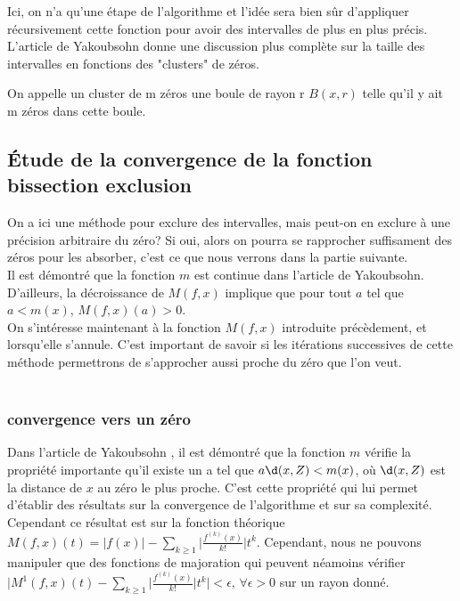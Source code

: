 \documentclass[a4paper,10.5pt]{article}
\begin{document}
	\noindent Ici, on n'a qu'une étape de l'algorithme et l'idée sera bien sûr d'appliquer récursivement cette fonction pour avoir des intervalles de plus en plus précis. L'article de Yakoubsohn donne une discussion plus complète sur la taille des intervalles en fonctions des "clusters" de zéros.\\
	
	\begin{definition}
		On appelle un cluster de m zéros une boule de rayon r $B(x,r)$ telle qu'il y ait m zéros dans cette boule.
	\end{definition}
	
	\subsection{Étude de la convergence de la fonction bissection exclusion}
	On a ici une méthode pour exclure des intervalles, mais peut-on en exclure à une précision arbitraire du zéro? Si oui, alors on pourra se rapprocher suffisament des zéros pour les absorber, c'est ce que nous verrons dans la partie suivante.\\
	Il est démontré que la fonction $m$ est continue dans l'article de Yakoubsohn. 
	D'ailleurs, la décroissance de $M(f,x)$ implique que pour tout $a$ tel que $a<m(x)$, $M(f,x)(a)>0$.\\
	On s'intéresse maintenant à la fonction $M(f,x)$ introduite précèdement, et lorsqu'elle s'annule. C'est important de savoir si les itérations successives de cette méthode permettrons de s'approcher aussi proche du zéro que l'on veut.\\
	\\
	\subsubsection{convergence vers un zéro}
	Dans l'article de Yakoubsohn \cite{DBLP:journals/jc/Yakoubsohn05}, il est démontré que la fonction $m$ vérifie la propriété importante qu'il existe un a tel que 
	$a\d(x,Z)<m(x)$, où $\d(x,Z)$ est la distance de $x$ au zéro le plus proche. C'est cette propriété qui lui permet d'établir des résultats sur la convergence de l'algorithme et sur sa complexité.\\
	Cependant ce résultat est sur la fonction théorique $M(f,x)(t)=|f(x)|-\sum_{k\geq1}\big|\frac{f^{(k)}(x)}{k!}\big|t^k$. Cependant, nous ne pouvons manipuler que des fonctions de majoration qui peuvent néamoins vérifier $\Big|M^1(f,x)(t)-\sum_{k\geq1}\big|\frac{f^{(k)}(x)}{k!}\big|t^k\Big| < \epsilon, \, \forall \epsilon>0$ sur un rayon donné.
	
\end{document}
